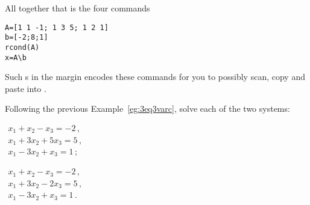 \begin{example}
\begin{solution}
\begin{enumerate}
\end{enumerate}
All together that is the four commands
\begin{verbatim}
A=[1 1 -1; 1 3 5; 1 2 1]
b=[-2;8;1]
rcond(A)
x=A\b
\end{verbatim}
\setbox\ajrqrbox\hbox{}%
\marginpar{\usebox{\ajrqrbox\\[2ex]}}%
Such s in the margin encodes these commands for you to possibly scan, copy and paste into \script.
\end{solution}
\end{example}


\begin{example} \label{eg:3eq3vard}
Following the previous Example~\ref{eg:3eq3varc}, solve each of the two systems:
\begin{parts}
\item \(\begin{array}{l}
x_1+x_2-x_3=-2\,,\\
x_1+3x_2+5x_3=5\,,\\
x_1-3x_2+x_3=1\,;
\end{array}\)
\item \(\begin{array}{l}
x_1+x_2-x_3=-2\,,\\
x_1+3x_2-2x_3=5\,,\\
x_1-3x_2+x_3=1\,.
\end{array}\)
\end{parts}


\end{example}
